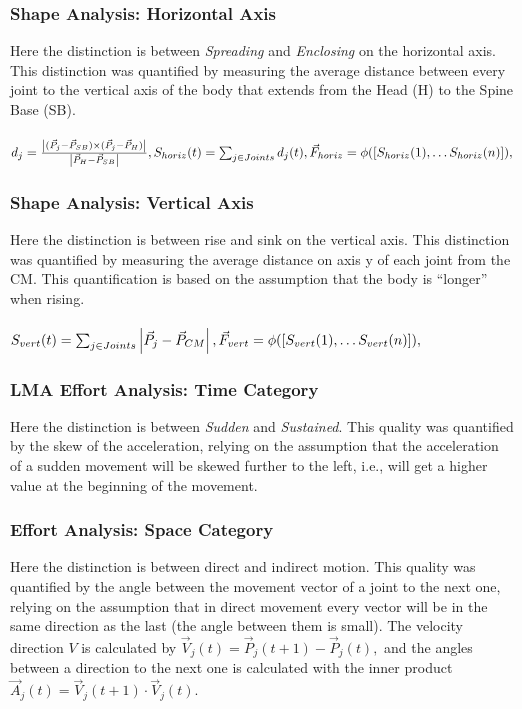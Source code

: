 \documentclass[11pt,twocolumn,varwidth=true,a4paper,fleqn]{article}
\begin{document}
\subsubsection{Shape Analysis: Horizontal Axis}
Here the distinction is between \textit{Spreading} and \textit{Enclosing} on the horizontal axis.
This distinction was quantified by measuring the average distance between every joint to 
the vertical axis of the body that extends from the Head (H) to the Spine Base (SB).
\\
\\$d_{j} = \frac{\left|(\vec{P}_{j}-\vec{P}_{SB})\times
(\vec{P}_{j}-\vec{P}_{H})\right|}{\left|\vec{P}_{H}-\vec{P}_{SB}\right|},
\\
\\S_{horiz}(t) = \sum_{j \in Joints} d_{j}(t),
\\
\\\vec{F}_{horiz} = \phi([S_{horiz}(1), \ldots S_{horiz}(n)]),$
\subsubsection{Shape Analysis: Vertical Axis}
Here the distinction is between rise and sink on the vertical axis.
This distinction was quantified by measuring the average distance on axis y of each joint from the CM. This quantification is based on the assumption that the body
is ``longer'' when rising.
\\\\$S_{vert}(t) = \sum_{j \in Joints}
\left|\vec{P}_{j}-\vec{P}_{CM}\right|,
\\\\\vec{F}_{vert} = \phi([S_{vert}(1), \ldots S_{vert}(n)]),$
\subsubsection{LMA Effort Analysis: Time Category}
Here the distinction is between \textit{Sudden} and \textit{Sustained}. This quality was quantified by the skew of the acceleration, relying on the assumption that the
acceleration of a sudden movement will be skewed further to the left, i.e., will get
a higher value at the beginning of the movement.
\subsubsection{Effort Analysis: Space Category}
Here the distinction is between direct and indirect motion. This quality was 
quantified by the angle between the movement vector of a joint to the next one,
relying on the assumption that in direct movement every vector will be in
the same direction as the last (the angle between them is small).
The velocity direction $V$ is calculated by
$\vec{V}_{j}(t) = \vec{P}_{j}(t+1) - \vec{P}_{j}(t),$
and the angles between a direction to the next one is calculated with the inner product
$\vec{A}_{j}(t) = \vec{V}_{j}(t+1) \cdot \vec{V}_{j}(t).$
\end{document}
